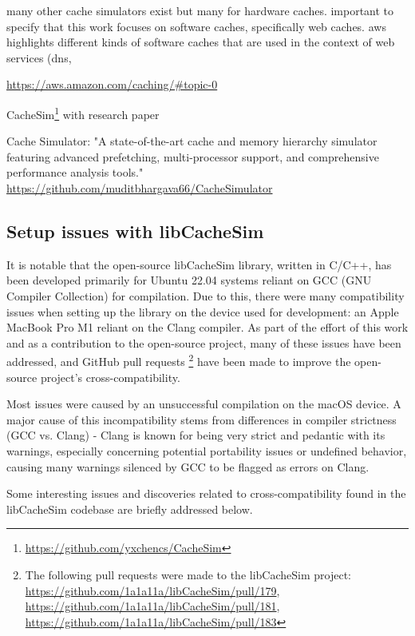 many other cache simulators exist but many for hardware caches. important to specify that this work focuses on software caches, specifically web caches. aws highlights different kinds of software caches that are used in the context of web services (dns,

\url{https://aws.amazon.com/caching/#topic-0}

CacheSim\footnote{\url{https://github.com/yxchencs/CacheSim}} with research paper \cite{cachesim}

Cache Simulator:
"A state-of-the-art cache and memory hierarchy simulator featuring advanced prefetching, multi-processor support, and comprehensive performance analysis tools."
\url{https://github.com/muditbhargava66/CacheSimulator}






\subsection{Setup issues with libCacheSim}

It is notable that the open-source libCacheSim library, written in C/C++, has been developed primarily for Ubuntu 22.04 systems reliant on GCC (GNU Compiler Collection) for compilation. Due to this, there were many compatibility issues when setting up the library on the device used for development: an Apple MacBook Pro M1 reliant on the Clang compiler. As part of the effort of this work and as a contribution to the open-source project, many of these issues have been addressed, and GitHub pull requests \footnote{The following pull requests were made to the libCacheSim project: \url{https://github.com/1a1a11a/libCacheSim/pull/179}, \url{https://github.com/1a1a11a/libCacheSim/pull/181}, \url{https://github.com/1a1a11a/libCacheSim/pull/183}} have been made to improve the open-source project's cross-compatibility.

Most issues were caused by an unsuccessful compilation on the macOS device. A major cause of this incompatibility stems from differences in compiler strictness (GCC vs. Clang) - Clang is known for being very strict and pedantic with its warnings, especially concerning potential portability issues or undefined behavior\cite{llvm_diagnostics}, causing many warnings silenced by GCC to be flagged as errors on Clang.

Some interesting issues and discoveries related to cross-compatibility found in the libCacheSim codebase are briefly addressed below.

